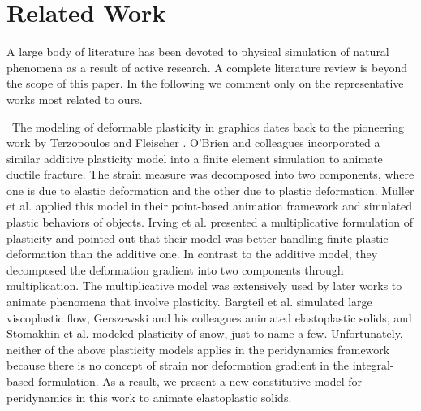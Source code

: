 \section{Related Work}

A large body of literature has been devoted to physical simulation of natural phenomena as a result of active research. A complete literature review is beyond the scope of this paper. In the following we comment only on the representative works most related to ours.

~The modeling of deformable plasticity in graphics dates back to the pioneering work by Terzopoulos and Fleischer \cite{Terzopoulos:1988:MID:378456.378522}. O'Brien and colleagues \cite{O'Brien:2002:GMA:566654.566579} incorporated a similar additive plasticity model into a finite element simulation to animate ductile fracture. The strain measure was decomposed into two components, where one is due to elastic deformation and the other due to plastic deformation. M\"{u}ller et al. \cite{Muller:2004:PBA:1028523.1028542} applied this model in their point-based animation framework and simulated plastic behaviors of objects.  Irving et al. \cite{Irving:2004:IFE:1028523.1028541} presented a multiplicative formulation of plasticity and pointed out that their model was better handling finite plastic deformation than the additive one. In contrast to the additive model, they decomposed the deformation gradient into two components through multiplication. The multiplicative model was extensively used by later works to animate phenomena that involve plasticity. Bargteil et al. simulated large viscoplastic flow\cite{Bargteil:2007:FEM:1276377.1276397}, Gerszewski and his colleagues animated elastoplastic solids\cite{Gerszewski:2009:PMA:1599470.1599488}, and Stomakhin et al. modeled plasticity of snow\cite{Stomakhin:2013:MPM:2461912.2461948}, just to name a few. Unfortunately, neither of the above plasticity models applies in the peridynamics framework because there is no concept of strain nor deformation gradient in the integral-based formulation. As a result, we present a new constitutive model for peridynamics in this work to animate elastoplastic solids.

